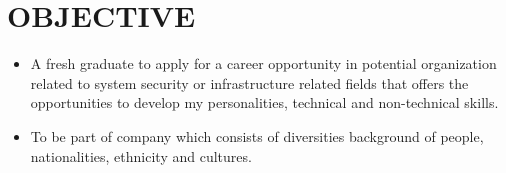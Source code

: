 \section{OBJECTIVE}
\begin{itemize}
    \item A fresh graduate to apply for a career opportunity in potential organization related to system security or infrastructure related fields that offers the opportunities to develop my personalities, technical and non-technical skills. 
    \item To be part of company which consists of diversities background of people, nationalities, ethnicity and cultures.
\end{itemize}